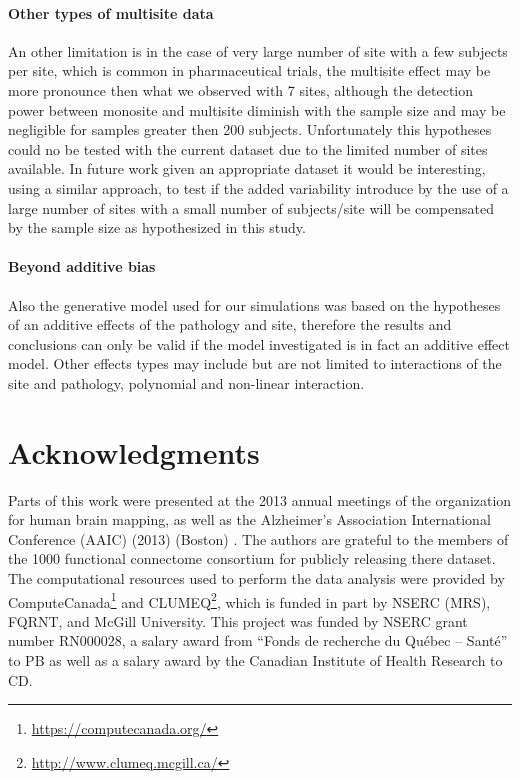 \documentclass[authoryear]{elsarticle}
\begin{document}
\paragraph{Other types of multisite data} An other limitation is in the case of very large number of site with a few subjects per site, which is common in pharmaceutical trials, the multisite effect may be more pronounce then what we observed with 7 sites, although the detection power between monosite and multisite diminish with the sample size and may be negligible for samples greater then 200 subjects. Unfortunately this hypotheses could no be tested with the current dataset due to the limited number of sites available. In future work given an appropriate dataset it would be interesting, using a similar approach, to test if the added variability introduce by the use of a large number of sites with a small number of subjects/site will be compensated by the sample size as hypothesized in this study.

\paragraph{Beyond additive bias} Also the generative model used for our simulations was based on the hypotheses of an additive effects of the pathology and site, therefore the results and conclusions can only be valid if the model investigated is in fact an additive effect model. Other effects types may include but are not limited to interactions of the site and pathology, polynomial and non-linear interaction.  

\section{Acknowledgments}
Parts of this work were presented at the 2013 annual meetings of the organization for human brain mapping, as well as the  Alzheimer's Association International Conference (AAIC) (2013) (Boston) \citep{Dansereau2013b}. The authors are grateful to the members of the 1000 functional connectome consortium for publicly releasing there dataset. The computational resources used to perform the data analysis were provided by ComputeCanada\footnote{\url{https://computecanada.org/}} and CLUMEQ\footnote{\url{http://www.clumeq.mcgill.ca/}}, which is funded in part by NSERC (MRS), FQRNT, and McGill University. This project was funded by NSERC grant number RN000028, a salary award from ``Fonds de recherche du Qu\'ebec -- Sant\'e'' to PB as well as a salary award by the Canadian Institute of Health Research to CD.
\end{document}
